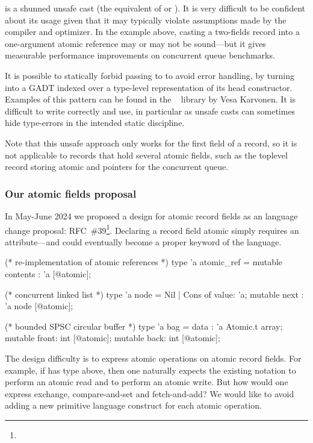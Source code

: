  is a shunned unsafe cast (the \OCaml equivalent of  or ).
It is very difficult to be confident about its usage given that it may typically violate assumptions made by the \OCaml compiler and optimizer.
In the example above, casting a two-fields record into a one-argument atomic reference may or may not be sound---but it gives measurable performance improvements on concurrent queue benchmarks.

It is possible to statically forbid passing  to  to avoid error handling, by turning  into a GADT indexed over a type-level representation of its head constructor.
Examples of this pattern can be found in the \Kcas~\cite{kcas} library by Vesa Karvonen.
It is difficult to write correctly and use, in particular as unsafe casts can sometimes hide type-errors in the intended static discipline.

Note that this unsafe approach only works for the first field of a record, so it is not applicable to records that hold several atomic fields, such as the toplevel record storing atomic  and  pointers for the concurrent queue.

\subsubsection{Our atomic fields proposal}

In May-June 2024 we proposed a design for atomic record fields as an \OCaml language change proposal: RFC~\#39\footnote{}.
Declaring a record field atomic simply requires an \ocamlinline{[@atomic]} attribute---and could eventually become a proper keyword of the language.

\begin{ocamlcode}
(* re-implementation of atomic references *)
type 'a atomic_ref = { mutable contents : 'a [@atomic]; }

(* concurrent linked list *)
type 'a node = Nil | Cons of { value: 'a; mutable next : 'a node [@atomic]; }

(* bounded SPSC circular buffer *)
type 'a bag =
  { data : 'a Atomic.t array;
    mutable front: int [@atomic];
    mutable back: int [@atomic]; }
\end{ocamlcode}

The design difficulty is to express atomic operations on atomic record fields.
For example, if  has type  above, then one naturally expects the existing notation  to perform an atomic read and  to perform an atomic write.
But how would one express exchange, compare-and-set and fetch-and-add?
We would like to avoid adding a new primitive language construct for each atomic operation.

